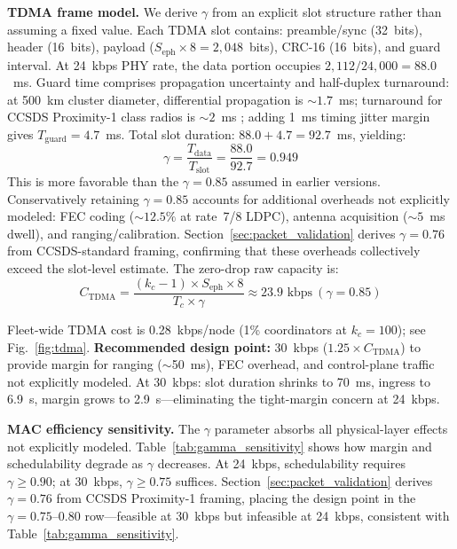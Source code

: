 \documentclass[journal]{IEEEtran}
\begin{document}
\textbf{TDMA frame model.}
\label{sec:tdma_frame}
We derive $\gamma$ from an explicit slot structure rather than assuming a fixed value. Each TDMA slot contains: preamble/sync (32~bits), header (16~bits), payload ($S_{\text{eph}} \times 8 = 2{,}048$~bits), CRC-16 (16~bits), and guard interval. At 24~kbps PHY rate, the data portion occupies $2{,}112 / 24{,}000 = 88.0$~ms. Guard time comprises propagation uncertainty and half-duplex turnaround: at 500~km cluster diameter, differential propagation is ${\sim}1.7$~ms; turnaround for CCSDS Proximity-1 class radios is ${\sim}2$~ms \cite{ccsds_prox1}; adding 1~ms timing jitter margin gives $T_{\text{guard}} = 4.7$~ms. Total slot duration: $88.0 + 4.7 = 92.7$~ms, yielding:
\begin{equation}
    \gamma = \frac{T_{\text{data}}}{T_{\text{slot}}} = \frac{88.0}{92.7} = 0.949
    \label{eq:gamma_derived}
\end{equation}
This is more favorable than the $\gamma = 0.85$ assumed in earlier versions. Conservatively retaining $\gamma = 0.85$ accounts for additional overheads not explicitly modeled: FEC coding (${\sim}12.5\%$ at rate~7/8 LDPC), antenna acquisition (${\sim}5$~ms dwell), and ranging/calibration. Section~\ref{sec:packet_validation} derives $\gamma = 0.76$ from CCSDS-standard framing, confirming that these overheads collectively exceed the slot-level estimate. The zero-drop raw capacity is:
\begin{equation}
    C_{\text{TDMA}} = \frac{(k_c - 1) \times S_{\text{eph}} \times 8}{T_c \times \gamma} \approx 23.9 \text{~kbps}~(\gamma = 0.85)
    \label{eq:tdma_capacity}
\end{equation}

\noindent Fleet-wide TDMA cost is 0.28~kbps/node (1\% coordinators at $k_c = 100$); see Fig.~\ref{fig:tdma}. \textbf{Recommended design point:} 30~kbps ($1.25 \times C_{\text{TDMA}}$) to provide margin for ranging (${\sim}$50~ms), FEC overhead, and control-plane traffic not explicitly modeled. At 30~kbps: slot duration shrinks to 70~ms, ingress to 6.9~s, margin grows to 2.9~s---eliminating the tight-margin concern at 24~kbps.

\textbf{MAC efficiency sensitivity.} The $\gamma$ parameter absorbs all physical-layer effects not explicitly modeled. Table~\ref{tab:gamma_sensitivity} shows how margin and schedulability degrade as $\gamma$ decreases. At 24~kbps, schedulability requires $\gamma \geq 0.90$; at 30~kbps, $\gamma \geq 0.75$ suffices. Section~\ref{sec:packet_validation} derives $\gamma = 0.76$ from CCSDS Proximity-1 framing, placing the design point in the $\gamma = 0.75$--$0.80$ row---feasible at 30~kbps but infeasible at 24~kbps, consistent with Table~\ref{tab:gamma_sensitivity}.
\end{document}
